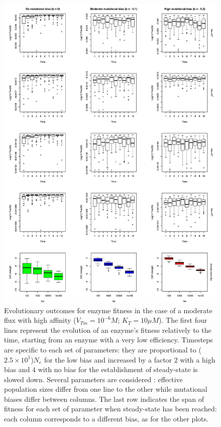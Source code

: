
\begin{figure}[h!]
\vspace{-0.25cm}
\begin{center}
\includegraphics[scale=0.5,trim=0cm 0cm 0cm 0cm,clip]{pics/SM-Enzymes/Evo_SteadyState_LowF.jpeg} 
\vspace{-0.1cm}
\caption{\small Evolutionary outcomes for enzyme fitness in the case of a moderate flux with high affinity ($V_{Tm}=10^{-6}M$; $K_T=10\mu M$). The first four lines represent the evolution of an enzyme's fitness relatively to the time, starting from an enzyme with a very low efficiency. Timesteps are specific to each set of parameters: they are proportional to ($2.5\times 10^1$)$N_e$ for the low bias and increased by a factor $2$ with a high bias and $4$ with no bias for the establishment of steady-state is slowed down. Several parameters are considered : effective population sizes differ from one line to the other while mutational biases differ between columns. The last row indicates the span of fitness for each set of parameter when steady-state has been reached: each column corresponds to a different bias, as for the other plots.}
\label{fig5a-ann}
\end{center}
\end{figure}


